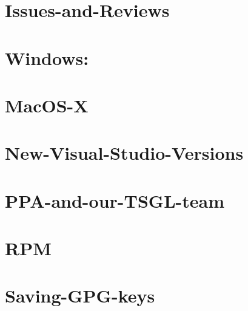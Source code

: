 \documentclass[twoside]{book}
\begin{document}
\chapter{Issues-\/and-\/\-Reviews}
\label{md__home_kodemonkey_workspace__t_s_g_l_docs-wiki__issues-and-_reviews}
\hypertarget{md__home_kodemonkey_workspace__t_s_g_l_docs-wiki__issues-and-_reviews}{}

\chapter{Windows\-:}
\label{md__home_kodemonkey_workspace__t_s_g_l_docs-wiki__library-_versions}
\hypertarget{md__home_kodemonkey_workspace__t_s_g_l_docs-wiki__library-_versions}{}

\chapter{Mac\-O\-S-\/\-X}
\label{md__home_kodemonkey_workspace__t_s_g_l_docs-wiki__mac_o_s-_x}
\hypertarget{md__home_kodemonkey_workspace__t_s_g_l_docs-wiki__mac_o_s-_x}{}

\chapter{New-\/\-Visual-\/\-Studio-\/\-Versions}
\label{md__home_kodemonkey_workspace__t_s_g_l_docs-wiki__new-_visual-_studio-_versions}
\hypertarget{md__home_kodemonkey_workspace__t_s_g_l_docs-wiki__new-_visual-_studio-_versions}{}

\chapter{P\-P\-A-\/and-\/our-\/\-T\-S\-G\-L-\/team}
\label{md__home_kodemonkey_workspace__t_s_g_l_docs-wiki__p_p_a-and-our-_t_s_g_l-team}
\hypertarget{md__home_kodemonkey_workspace__t_s_g_l_docs-wiki__p_p_a-and-our-_t_s_g_l-team}{}

\chapter{R\-P\-M}
\label{md__home_kodemonkey_workspace__t_s_g_l_docs-wiki__r_p_m}
\hypertarget{md__home_kodemonkey_workspace__t_s_g_l_docs-wiki__r_p_m}{}

\chapter{Saving-\/\-G\-P\-G-\/keys}
\label{md__home_kodemonkey_workspace__t_s_g_l_docs-wiki__saving-_g_p_g-keys}
\hypertarget{md__home_kodemonkey_workspace__t_s_g_l_docs-wiki__saving-_g_p_g-keys}{}

\end{document}

